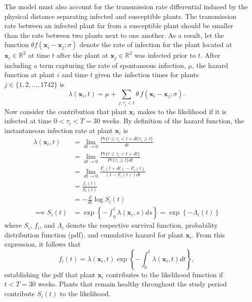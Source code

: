 \documentclass{uwstat572}
\begin{document}
The model must also account for the transmission rate differential induced by the physical distance separating infected and susceptible plants. 
The transmission rate between an infected plant far from a susceptible plant should be smaller than the rate between two plants next to one another.
As a result, let the function $\theta f(\boldsymbol{x}_i -\boldsymbol{x}_j; \sigma)$ denote the rate of infection for the plant located at $\boldsymbol{\boldsymbol{x}}_i \in \mathbb{R}^2$ at time $t$ after the plant at $\boldsymbol{x}_j \in \mathbb{R}^2$ was infected prior to $t$. 
After including a term capturing the rate of spontaneous infection, $\mu$, the hazard function at plant $i$ and time $t$ given the infection times for plants $j \in \{1, 2, \dots, 1742\}$ is 
$$\lambda(\boldsymbol{x}_i,t) = \mu + \sum_{j; \tau_j<t} \theta \, f(\boldsymbol{x}_i - \boldsymbol{x}_j; \sigma).$$
Now consider the contribution that plant $\boldsymbol{x}_i$ makes to the likelihood if it is infected at time $0<\tau_i<T=30$ weeks. 
By definition of the hazard function, the instantaneous infection rate at plant $\boldsymbol{x}_i$ is
\begin{align*}
\lambda(\boldsymbol{x}_i, t) &= \lim_{dt \to 0} \frac{Pr\{ t \le \tau_i < t+dt | \tau_i \ge t \}}{dt} \\
	&= \lim_{dt \to 0} \frac{Pr\{ t \le \tau_i < t+dt\}}{Pr\{\tau_i\ge t\}dt}\\
	&= \lim_{dt \to 0} \frac{F_i(t+dt) - F_i(t)}{(1-F_i(t))dt} \\
	&= \frac{f_i(t)}{S_i(t)}\\
	&= -\frac{d}{dt} \log S_i(t) \\
\implies S_i(t) &= \exp \left\{ - \int_0^t \lambda(\boldsymbol{x}_i,s) ds  \right\} = \exp \left\{ - \Lambda_i(t)  \right\}
\end{align*}
where $S_i$, $f_i$, and $\Lambda_i$ denote the respective survival function, probability distribution function (pdf), and cumulative hazard for plant $\boldsymbol{x}_i$. 
From this expression, it follows that
$$ f_i(t) = \lambda(\boldsymbol{x}_i,t) \exp \left\{ - \int_0^t \lambda(\boldsymbol{x}_i,t) dt  \right\},$$
establishing the pdf that plant $\boldsymbol{x}_i$ contributes to the likelihood function if $t<T=30$ weeks. 
Plants that remain healthy throughout the study period contribute $S_i(t)$ to the likelihood. 
\end{document}

